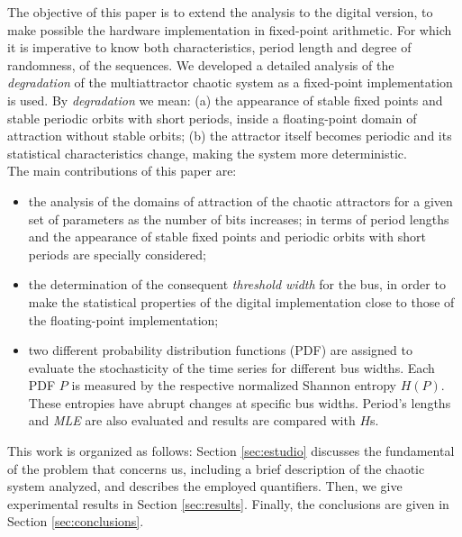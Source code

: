 The objective of this paper is to extend the analysis to the digital version, to make
possible  the hardware implementation in fixed-point arithmetic. For which it is imperative to know both characteristics, period length and degree of randomness, of the sequences.
We developed a detailed analysis of the \textsl{degradation} of the multiattractor chaotic system as a fixed-point implementation is used. By \textsl{degradation} we mean: (a) the appearance of stable fixed
points and stable periodic orbits with short periods, inside a
floating-point domain of attraction without stable orbits; (b) the
attractor itself becomes periodic and its statistical
characteristics change, making the system more deterministic.\\
The main contributions of this paper are: 
\begin{itemize}
\item the analysis of the domains of
attraction of the chaotic attractors for a given set of parameters
as the number of bits increases; in terms of period lengths and the appearance of stable fixed points and periodic
orbits with short periods are specially considered;
\item the determination of the consequent \textsl{threshold width} for the bus, in order to make the statistical
 properties of the digital implementation close to those of the floating-point implementation; 
\item  two different probability distribution functions (PDF) are assigned  to evaluate the stochasticity of the time series for different bus widths. Each PDF  $P$ is measured by the respective normalized Shannon entropy $H(P)$. These entropies have abrupt changes at specific bus widths. Period's lengths and \textsl{MLE} are also evaluated and results are compared with $H$s.
\end{itemize}
This work is organized as follows: Section \ref{sec:estudio} discusses the fundamental of the problem that concerns us, including a brief description of the chaotic system analyzed, and describes the employed quantifiers. Then, we give experimental results
in Section \ref{sec:results}. Finally, the conclusions are given in Section \ref{sec:conclusions}.
